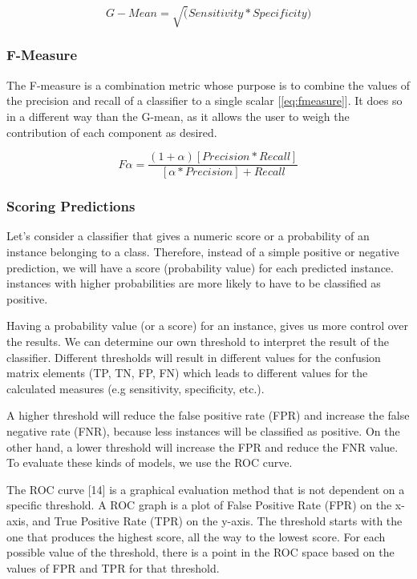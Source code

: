 \begin{equation}
    G-Mean = \sqrt(Sensitivity*Specificity) 
    \label{eq:gmean}
\end{equation}

\subsubsection{F-Measure}
The F-measure is a combination metric whose purpose is to combine the values of the precision and 
recall of a classifier to a single scalar [\ref{eq:fmeasure}]. It does so in a different way than the G-mean, 
as it allows the user to weigh the contribution of each component as desired.

\begin{equation}
    F \alpha = \frac{(1+\alpha)[Precision*Recall]}{[\alpha*Precision]+Recall} 
    \label{eq:fmeasure}
\end{equation}

\subsubsection{Scoring Predictions}

Let’s consider a classifier that gives a numeric score or a probability of an instance belonging to a 
class. Therefore, instead of a simple positive or negative prediction, we will have a score 
(probability value) for each predicted instance. instances with higher probabilities are more 
likely to have to be classified as positive.

Having a probability value (or a score) for an instance, gives us more control over the results. 
We can determine our own threshold to interpret the result of the classifier. Different thresholds 
will result in different values for the confusion matrix elements (TP, TN, FP, FN) which leads to 
different values for the calculated measures (e.g sensitivity, specificity, etc.).

A higher threshold will reduce the false positive rate (FPR) and increase the false negative rate 
(FNR), because less instances will be classified as positive. On the other hand, a lower threshold 
will increase the FPR and reduce the FNR value. To evaluate these kinds of models, we use the ROC curve.

The ROC curve [14] is a graphical evaluation method that is not dependent 
on a specific threshold. A ROC graph is a plot of False Positive Rate (FPR) on the x-axis, and 
True Positive Rate (TPR) on the y-axis. The threshold starts with the one that produces the highest 
score, all the way to the lowest score. For each possible value of the threshold, there is a point 
in the ROC space based on the values of FPR and TPR for that threshold.

